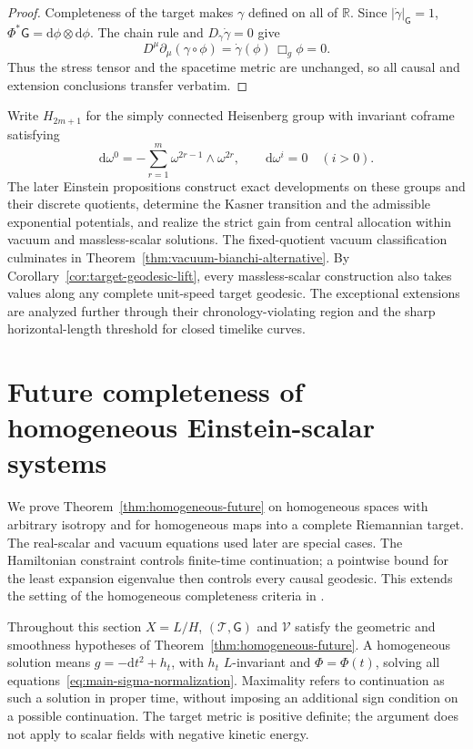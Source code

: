 \documentclass[10pt,a4paper]{article}
\numberwithin{equation}{section}
\theoremstyle{definition}
\theoremstyle{remark}
\newcommand{\dd}{\mathrm d}
\begin{document}
\begin{proof}
Completeness of the target makes $\gamma$ defined on all of $\mathbb R$.
Since $|\dot\gamma|_{\mathsf G}=1$,
$\Phi^*\mathsf G=\dd\phi\otimes\dd\phi$.  The chain rule and
$D_{\dot\gamma}\dot\gamma=0$ give
\[
 D^\mu\partial_\mu(\gamma\circ\phi)
 =\dot\gamma(\phi)\,\Box_g\phi=0.
\]
Thus the stress tensor and the spacetime metric are unchanged, so all
causal and extension conclusions transfer verbatim.
\end{proof}

Write $H_{2m+1}$ for the simply
connected Heisenberg group with invariant coframe satisfying
\[
 \dd\omega^0=-\sum_{r=1}^m\omega^{2r-1}\wedge\omega^{2r},
 \qquad \dd\omega^i=0\quad(i>0).
\]
The later Einstein propositions construct exact developments on these
groups and their discrete quotients, determine the Kasner transition and
the admissible exponential potentials, and realize the strict gain from
central allocation within vacuum and massless-scalar solutions.  The
fixed-quotient vacuum classification culminates in
Theorem~\ref{thm:vacuum-bianchi-alternative}.  By
Corollary~\ref{cor:target-geodesic-lift}, every massless-scalar
construction also takes values along any complete unit-speed target
geodesic.  The exceptional extensions are analyzed further through their
chronology-violating region and the sharp horizontal-length threshold for
closed timelike curves.

\section{Future completeness of homogeneous Einstein-scalar systems}
\label{sec:homogeneous-future}

We prove Theorem~\ref{thm:homogeneous-future} on homogeneous spaces
with arbitrary isotropy and for homogeneous maps into a complete
Riemannian target.  The real-scalar and vacuum equations used later
are special cases.  The Hamiltonian constraint controls finite-time
continuation; a pointwise bound for the least expansion eigenvalue
then controls every causal geodesic.  This extends the setting of
the homogeneous completeness criteria in
\cite{Rendall1995Matter,GoedekeRendall2010,Lee2005}.

Throughout this section $X=L/H$, $(\mathcal T,\mathsf G)$ and
$\mathcal V$ satisfy the geometric and smoothness hypotheses of
Theorem~\ref{thm:homogeneous-future}.  A homogeneous solution means
$g=-\dd t^2+h_t$, with $h_t$ $L$-invariant and $\Phi=\Phi(t)$,
solving all equations~\eqref{eq:main-sigma-normalization}.  Maximality
refers to continuation as such a solution in proper time, without
imposing an additional sign condition on a possible continuation.
The target metric is positive definite; the argument does not apply
to scalar fields with negative kinetic energy.
\end{document}
